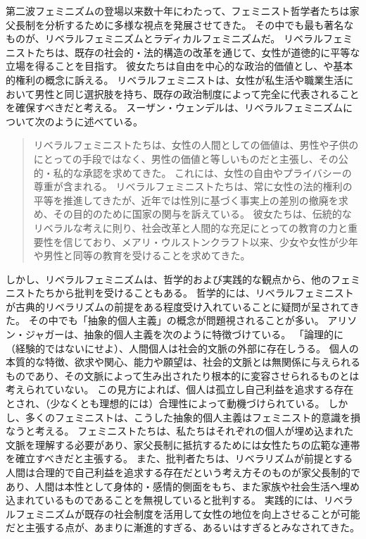 \documentclass[paper=a4,book,openany]{jlreq}
\begin{document}
第二波フェミニズムの登場以来数十年にわたって、フェミニスト哲学者たちは家父長制を分析するために多様な視点を発展させてきた。
その中でも最も著名なものが、リベラルフェミニズムとラディカルフェミニズムだ。
リベラルフェミニストたちは、既存の社会的・法的構造の改革を通じて、女性が道徳的に平等な立場を得ることを目指す。
彼女たちは自由を中心的な政治的価値とし、や基本的権利の概念に訴える。
リベラルフェミニストは、女性が私生活や職業生活において男性と同じ選択肢を持ち、既存の政治制度によって完全に代表されることを確保すべきだと考える。
スーザン・ウェンデルは、リベラルフェミニズムについて次のように述べている。

\begin{quote}
リベラルフェミニストたちは、女性の人間としての価値は、男性や子供のにとっての手段ではなく、男性の価値と等しいものだと主張し、その公的・私的な承認を求めてきた。
これには、女性の自由やプライバシーの尊重が含まれる。
リベラルフェミニストたちは、常に女性の法的権利の平等を推進してきたが、近年では性別に基づく事実上の差別の撤廃を求め、その目的のために国家の関与を訴えている。
彼女たちは、伝統的なリベラルな考えに則り、社会改革と人間的な充足にとっての教育の力と重要性を信じており、メアリ・ウルストンクラフト以来、少女や女性が少年や男性と同等の教育を受けることを求めてきた。
\citep[p.66]{wendell87:_qualif_defen_liber_femin}
\end{quote}

しかし、リベラルフェミニズムは、哲学的および実践的な観点から、他のフェミニストたちから批判を受けることもある。
哲学的には、リベラルフェミニストが古典的リベラリズムの前提をある程度受け入れていることに疑問が呈されてきた。
その中でも「抽象的個人主義」の概念が問題視されることが多い。
アリソン・ジャガーは、抽象的個人主義を次のように特徴づけている。
「論理的に（経験的ではないにせよ）、人間個人は社会的文脈の外部に存在しうる。
個人の本質的な特徴、欲求や関心、能力や願望は、社会的文脈とは無関係に与えられるものであり、その文脈によって生み出されたり根本的に変容させられるものとは考えられていない\citep[pp.28-29]{jaggar83:_femin_polit_human_natur}。
この見方によれば、個人は孤立し自己利益を追求する存在とされ、（少なくとも理想的には）合理性によって動機づけられている。
しかし、多くのフェミニストは、こうした抽象的個人主義はフェミニスト的意識を損なうと考える。
フェミニストたちは、私たちはそれぞれの個人が埋め込まれた文脈を理解する必要があり、家父長制に抵抗するためには女性たちの広範な連帯を確立すべきだと主張する。
また、批判者たちは、リベラリズムが前提とする人間は合理的で自己利益を追求する存在だという考え方そのものが家父長制的であり、人間は本性として身体的・感情的側面をもち、また家族や社会生活へ埋め込まれているものであることを無視していると批判する。
実践的には、リベラルフェミニズムが既存の社会制度を活用して女性の地位を向上させることが可能だと主張する点が、あまりに漸進的すぎる、あるいはすぎるとみなされてきた。
\end{document}
